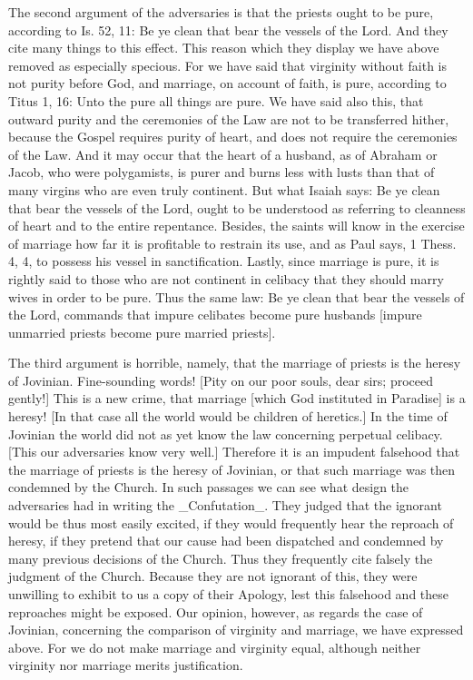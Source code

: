 The second argument of the adversaries is that the priests ought to
be pure, according to Is. 52, 11: Be ye clean that bear the vessels
of the Lord.  And they cite many things to this effect.  This reason
which they display we have above removed as especially specious.  For
we have said that virginity without faith is not purity before God,
and marriage, on account of faith, is pure, according to Titus 1, 16:
Unto the pure all things are pure.  We have said also this, that
outward purity and the ceremonies of the Law are not to be
transferred hither, because the Gospel requires purity of heart, and
does not require the ceremonies of the Law.  And it may occur that
the heart of a husband, as of Abraham or Jacob, who were polygamists,
is purer and burns less with lusts than that of many virgins who are
even truly continent.  But what Isaiah says: Be ye clean that bear
the vessels of the Lord, ought to be understood as referring to
cleanness of heart and to the entire repentance.  Besides, the saints
will know in the exercise of marriage how far it is profitable to
restrain its use, and as Paul says, 1 Thess. 4, 4, to possess his
vessel in sanctification.  Lastly, since marriage is pure, it is
rightly said to those who are not continent in celibacy that they
should marry wives in order to be pure.  Thus the same law: Be ye
clean that bear the vessels of the Lord, commands that impure
celibates become pure husbands [impure unmarried priests become pure
married priests].

The third argument is horrible, namely, that the marriage of priests
is the heresy of Jovinian.  Fine-sounding words!  [Pity on our poor
souls, dear sirs; proceed gently!] This is a new crime, that marriage
[which God instituted in Paradise] is a heresy!  [In that case all
the world would be children of heretics.] In the time of Jovinian the
world did not as yet know the law concerning perpetual celibacy.
[This our adversaries know very well.] Therefore it is an impudent
falsehood that the marriage of priests is the heresy of Jovinian, or
that such marriage was then condemned by the Church.  In such
passages we can see what design the adversaries had in writing the
_Confutation_.  They judged that the ignorant would be thus most
easily excited, if they would frequently hear the reproach of heresy,
if they pretend that our cause had been dispatched and condemned by
many previous decisions of the Church.  Thus they frequently cite
falsely the judgment of the Church.  Because they are not ignorant of
this, they were unwilling to exhibit to us a copy of their Apology,
lest this falsehood and these reproaches might be exposed.  Our
opinion, however, as regards the case of Jovinian, concerning the
comparison of virginity and marriage, we have expressed above.  For
we do not make marriage and virginity equal, although neither
virginity nor marriage merits justification.

